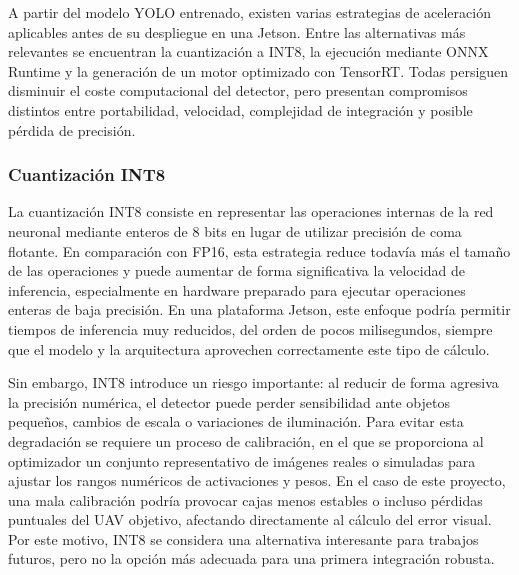 \vspace{0.3cm}

A partir del modelo YOLO entrenado, existen varias estrategias de aceleración aplicables antes de su despliegue en una Jetson. Entre las alternativas más relevantes se encuentran la cuantización a INT8, la ejecución mediante ONNX Runtime y la generación de un motor optimizado con TensorRT. Todas persiguen disminuir el coste computacional del detector, pero presentan compromisos distintos entre portabilidad, velocidad, complejidad de integración y posible pérdida de precisión.

\vspace{0.3cm}

\subsubsection{Cuantización INT8}

La cuantización INT8 consiste en representar las operaciones internas de la red neuronal mediante enteros de 8 bits en lugar de utilizar precisión de coma flotante. En comparación con FP16, esta estrategia reduce todavía más el tamaño de las operaciones y puede aumentar de forma significativa la velocidad de inferencia, especialmente en hardware preparado para ejecutar operaciones enteras de baja precisión. En una plataforma Jetson, este enfoque podría permitir tiempos de inferencia muy reducidos, del orden de pocos milisegundos, siempre que el modelo y la arquitectura aprovechen correctamente este tipo de cálculo.

\vspace{0.3cm}

Sin embargo, INT8 introduce un riesgo importante: al reducir de forma agresiva la precisión numérica, el detector puede perder sensibilidad ante objetos pequeños, cambios de escala o variaciones de iluminación. Para evitar esta degradación se requiere un proceso de calibración, en el que se proporciona al optimizador un conjunto representativo de imágenes reales o simuladas para ajustar los rangos numéricos de activaciones y pesos. En el caso de este proyecto, una mala calibración podría provocar cajas menos estables o incluso pérdidas puntuales del UAV objetivo, afectando directamente al cálculo del error visual. Por este motivo, INT8 se considera una alternativa interesante para trabajos futuros, pero no la opción más adecuada para una primera integración robusta.

\vspace{0.3cm}

